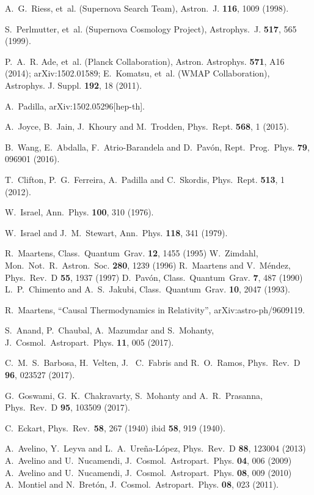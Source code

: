 \documentclass[twocolumn,showpacs,nofootinbib,floats,amsmath,amssymb]{revtex4}
\begin{document}
\begin{thebibliography}{99}
A.~G.~Riess, et~al. (Supernova Search Team), Astron.\ J. {\bf 116}, 1009 (1998). 

S.~Perlmutter, et~al. (Supernova Cosmology Project), Astrophys.\ J. {\bf 517}, 565 (1999).

 P.~A.~R. Ade, et~al. (Planck Collaboration), Astron.\; Astrophys.
{\bf{571}}, A16 (2014); arXiv:1502.01589; E.~Komatsu, et~al. (WMAP Collaboration), Astrophys. J. Suppl. {\bf 192}, 18 (2011).

A.~Padilla, arXiv:1502.05296[hep-th].

A.~Joyce, B.~Jain, J.~Khoury and M.~Trodden, Phys.\ Rept. {\bf 568}, 1 (2015). 

B.~Wang, E.~Abdalla, F.~Atrio-Barandela and D.~Pav\'on, Rept.\ Prog.\ Phys. {\bf 79}, 096901 (2016).

T.~Clifton, P.~G.~Ferreira, A.~Padilla and C.~Skordis, Phys.\ Rept. {\bf 513}, 1 (2012). 

W.~Israel, Ann.\ Phys. {\bf 100}, 310 (1976).

W.~Israel and J.~M.~Stewart, Ann.\ Phys. {\bf 118}, 341 (1979).

R.~Maartens, Class.\ Quantum\ Grav. {\bf 12}, 1455 (1995)\; W.~Zimdahl, Mon.\ Not.\ R.\ Astron.\ Soc. {\bf 280}, 1239 (1996)\; R.~Maartens and V.~M\'endez, Phys.\ Rev.\ D {\bf 55}, 1937 (1997)\; D.~Pav\'on, Class.\ Quantum\ Grav. {\bf 7}, 487 (1990)\; L.~P.~Chimento and A.~S.~Jakubi, Class.\ Quantum\ Grav. {\bf 10}, 2047 (1993).

R.~Maartens, ``Causal Thermodynamics in Relativity'', arXiv:astro-ph/9609119.

S.~Anand, P.~Chaubal, A.~Mazumdar and S.~Mohanty, J.\ Cosmol.\ Astropart.\ Phys. {\bf 11}, 005 (2017).  

C.~M.~S.~Barbosa, H.~Velten, J.~ C.~Fabris and R.~O.~Ramos, Phys.\ Rev.\ D {\bf 96}, 023527 (2017). 

G.~Goswami, G.~K.~Chakravarty, S.~Mohanty and A.~R.~Prasanna, Phys.\ Rev.\ D {\bf 95}, 103509 (2017). 

C.~Eckart, Phys.\ Rev.\ {\bf 58}, 267 (1940)\; ibid {\bf 58}, 919 (1940).

 A.~Avelino, Y.~Leyva and L.~A.~Ure\~na-L\'opez, Phys.\ Rev.\ D {\bf 88}, 123004 (2013)\;  A.~Avelino and U.~Nucamendi, J.\ Cosmol.\ Astropart.\ Phys. {\bf 04}, 006 (2009)\; A.~Avelino and U.~Nucamendi, J.\ Cosmol.\ Astropart.\ Phys. {\bf 08}, 009 (2010)\;  A.~Montiel and N.~Bret\'on, J.\ Cosmol.\ Astropart.\ Phys. {\bf 08}, 023 (2011).
 

\end{thebibliography}
\end{document}

